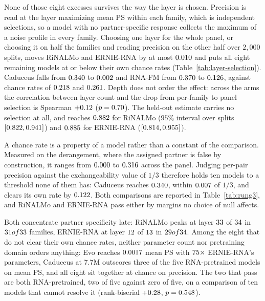 \documentclass[11pt]{article}
\begin{document}
None of those eight excesses survives the way the layer is chosen. Precision is
read at the layer maximizing mean PS within each family, which is
\chanceRateN{} independent selections, so a model with no partner-specific
response collects the maximum of a noise profile in every family. Choosing one
layer for the whole panel, or choosing it on half the families and reading
precision on the other half over $2{,}000$ splits, moves RiNALMo and ERNIE-RNA
by at most $0.010{}$ and puts all eight remaining models at or
below their own
chance rates (Table~\ref{tab:layer-selection}). Caduceus falls from
$0.340{}$ to $0.002{}$ and RNA-FM from
$0.370{}$ to $0.126{}$, against chance rates of
$0.218{}$ and $0.261{}$. Depth does not order the effect: across the \selectionArms{} arms the
correlation between layer count and the drop from per-family to panel selection
is Spearman $+0.12{}$ ($p = 0.70{}$). The held-out
estimate carries no selection at all, and reaches $0.882{}$ for
RiNALMo ($95\%$ interval over splits $[0.822, 0.941]{}$) and
$0.885{}$ for ERNIE-RNA ($[0.814, 0.955]{}$).



A chance rate is a property of a model rather than a constant of the comparison.
Measured on the derangement, where the assigned partner is false by
construction, it ranges from $0.000{}$ to $0.316{}$ across
the panel. Judging
per-pair precision against the exchangeability value of $1/3$ therefore holds
ten models to a threshold none of them has: Caduceus reaches
$0.340{}$, within $0.007{}$ of $1/3$, and clears
its own rate by $0.122{}$. Both comparisons are
reported in Table~\ref{tab:rung3}, and RiNALMo and ERNIE-RNA pass either by
margins no choice of null affects.

Both concentrate partner specificity late: RiNALMo peaks at layer
$33{}$ of $34{}$ in $31 of 33{}$ families,
ERNIE-RNA at layer $12{}$ of $13{}$ in
$29 of 34{}$. Among the eight that do not clear their own chance
rates, neither parameter count nor pretraining domain orders anything: Evo
reaches $0.0017{}$ mean PS with $75{}\times$ ERNIE-RNA's parameters, Caduceus at
7.7M outscores three of the five RNA-pretrained models on mean PS, and all eight
sit together at chance on precision. The two that pass are both
RNA-pretrained, two of five against zero of five, on a comparison of ten models
that cannot resolve it (rank-biserial $+0.28{}$,
$p = 0.548{}$).
\end{document}
